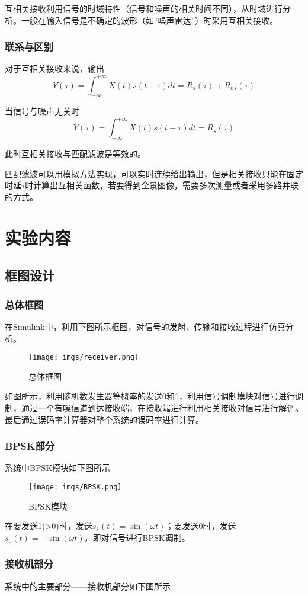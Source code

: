 \documentclass[a4paper]{article}
\begin{document}
互相关接收利用信号的时域特性（信号和噪声的相关时间不同），从时域进行分析。一般在输入信号是不确定的波形（如“噪声雷达”）时采用互相关接收。

\subsubsection{联系与区别}
对于互相关接收来说，输出$$Y(\tau)=\int_{-\infty}^{+\infty}X(t)s(t-\tau)dt=R_s(\tau)+R_{ns}(\tau)$$

当信号与噪声无关时$$Y(\tau)=\int_{-\infty}^{+\infty}X(t)s(t-\tau)dt=R_s(\tau)$$

此时互相关接收与匹配滤波是等效的。

匹配滤波可以用模拟方法实现，可以实时连续给出输出，但是相关接收只能在固定时延$\tau$时计算出互相关函数，若要得到全景图像，需要多次测量或者采用多路并联的方式。
\section{实验内容}
\subsection{框图设计}
\subsubsection{总体框图}
在Simulink中，利用下图所示框图，对信号的发射、传输和接收过程进行仿真分析。
\begin{figure}[htbp]
\centering
\texttt{[image: imgs/receiver.png]}
\caption{总体框图}
\end{figure}

如图所示，利用随机数发生器等概率的发送0和1，利用信号调制模块对信号进行调制，通过一个有噪信道到达接收端，在接收端进行利用相关接收对信号进行解调。最后通过误码率计算器对整个系统的误码率进行计算。

\subsubsection{BPSK部分}
系统中BPSK模块如下图所示
\begin{figure}[htbp]
\centering
\texttt{[image: imgs/BPSK.png]}
\caption{BPSK模块}
\end{figure}

在要发送1(>0)时，发送$s_{1}(t)=\sin(\omega t)$；要发送0时，发送$s_{0}(t)=-\sin(\omega t)$，即对信号进行BPSK调制。

\subsubsection{接收机部分}
系统中的主要部分——接收机部分如下图所示
\newpage
\end{document}
